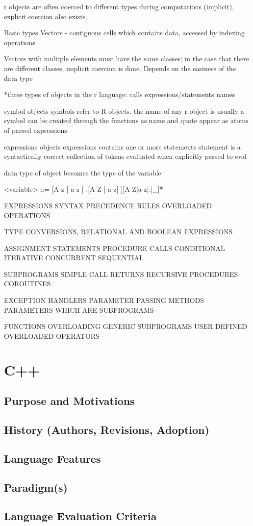 \documentclass[12pt]{article}
\begin{document}
r objects are often coerced to different types during computations (implicit), explicit coercion also exists.

Basic types
Vectors - contiguous cells which contains data, accessed by indexing operations

Vectors with multiple elements must have the same classes; in the case that there are different classes, implicit coercion is done. Depends on the easiness of the data type

*three types of objects in the r language:
calls
expressions/statements
names

symbol objects
symbols refer to R objects. the name of any r object is usually a symbol
can be created through the functions as.name and quote
appear as atoms of parsed expressions

expressions objects
expressions contains one or more statements
statement is a syntactically correct collection of tokens
evaluated when explicitly passed to eval

data type of object becomes the type of the variable


<variable> ::= [A-z | a-z | .[A-Z | a-z] ][A-Z|a-z|.|_]*



EXPRESSIONS
SYNTAX
PRECEDENCE RULES
OVERLOADED OPERATIONS

TYPE CONVERSIONS, RELATIONAL AND BOOLEAN EXPRESSIONS

ASSIGNMENT STATEMENTS
PROCEDURE CALLS
CONDITIONAL
ITERATIVE
CONCURRENT
SEQUENTIAL

SUBPROGRAMS
SIMPLE CALL RETURNS
RECURSIVE PROCEDURES
COROUTINES

EXCEPTION HANDLERS
PARAMETER PASSING METHODS
PARAMETERS WHICH ARE SUBPROGRAMS

FUNCTIONS OVERLOADING
GENERIC SUBPROGRAMS
USER DEFINED OVERLOADED OPERATORS

\fi


\section{C++}
\subsection{Purpose and Motivations}
\subsection{History (Authors, Revisions, Adoption)}
\subsection{Language Features}
\subsection{Paradigm(s)}
\subsection{Language Evaluation Criteria}
\end{document}
